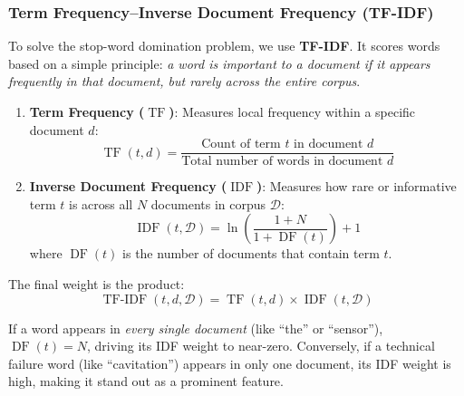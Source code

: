 \subsubsection{Term Frequency--Inverse Document Frequency (TF-IDF)}
To solve the stop-word domination problem, we use \textbf{TF-IDF}. It scores words based on a simple principle: \emph{a word is important to a document if it appears frequently in that document, but rarely across the entire corpus}.

\begin{keyidea}
\begin{enumerate}
    \item \textbf{Term Frequency ($\operatorname{TF}$)}: Measures local frequency within a specific document $d$:
    \begin{equation}
    \operatorname{TF}(t, d) = \frac{\text{Count of term } t \text{ in document } d}{\text{Total number of words in document } d}\label{eq:tf}
    \end{equation}
    \item \textbf{Inverse Document Frequency ($\operatorname{IDF}$)}: Measures how rare or informative term $t$ is across all $N$ documents in corpus $\mathcal{D}$:
    \begin{equation}
    \operatorname{IDF}(t, \mathcal{D}) = \ln\left(\frac{1 + N}{1 + \operatorname{DF}(t)}\right) + 1\label{eq:idf}
    \end{equation}
    where $\operatorname{DF}(t)$ is the number of documents that contain term $t$.
\end{enumerate}
The final weight is the product:
\begin{equation}
\operatorname{TF-IDF}(t, d, \mathcal{D}) = \operatorname{TF}(t, d) \times \operatorname{IDF}(t, \mathcal{D})\label{eq:tfidf}
\end{equation}
\end{keyidea}

If a word appears in \emph{every single document} (like ``the'' or ``sensor''), $\operatorname{DF}(t) = N$, driving its IDF weight to near-zero. Conversely, if a technical failure word (like ``cavitation'') appears in only one document, its IDF weight is high, making it stand out as a prominent feature.

